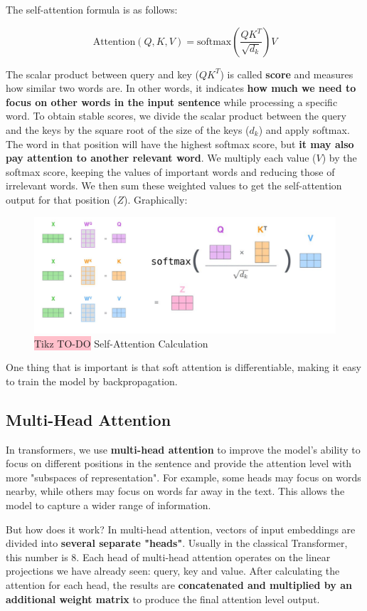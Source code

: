 The self-attention formula is as follows:

$$
    \text{Attention}(Q,K,V) = \text{softmax}\left(\frac{QK^T}{\sqrt{d_k}}\right)V
$$

The scalar product between query and key ($QK^T$) is called \textbf{score} and measures how similar two words are. In other words, it indicates \textbf{how much we need to focus on other words in the input sentence} while processing a specific word. To obtain stable scores, we divide the scalar product between the query and the keys by the square root of the size of the keys (\(d_k\)) and apply softmax. The word in that position will have the highest softmax score, but \textbf{it may also pay attention to another relevant word}. We multiply each value ($V$) by the softmax score, keeping the values of important words and reducing those of irrelevant words. We then sum these weighted values to get the self-attention output for that position ($Z$). Graphically:

\begin{figure}[!htbp]
    \centering
    \includegraphics[width=0.8\linewidth]{tikz/chapter8 - Self-Attention Calculation.png}
    \caption{{\color{red}\colorbox{pink}{Tikz TO-DO}} Self-Attention Calculation}
\end{figure}

One thing that is important is that soft attention is differentiable, making it easy to train the model by backpropagation.


\subsection{Multi-Head Attention}
In transformers, we use \textbf{multi-head attention} to improve the model's ability to focus on different positions in the sentence and provide the attention level with more "subspaces of representation". For example, some heads may focus on words nearby, while others may focus on words far away in the text. This allows the model to capture a wider range of information.

But how does it work? In multi-head attention, vectors of input embeddings are divided into \textbf{several separate "heads"}. Usually in the classical Transformer, this number is 8. Each head of multi-head attention operates on the linear projections we have already seen: query, key and value. After calculating the attention for each head, the results are \textbf{concatenated and multiplied by an additional weight matrix} to produce the final attention level output.

